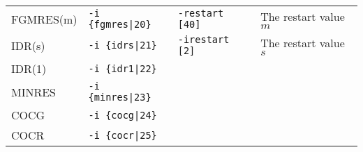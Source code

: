 \documentclass[a4paper]{article}
\begin{document}
\begin{minipage}[t]{\textwidth}
\begin{center}
\begin{tabular}{l|lll}
 FGMRES(m)   & \verb=-i {fgmres|20}=    & \verb=-restart [40]= & The restart value $m$   \\ 
 IDR(s)      & \verb=-i {idrs|21}=      & \verb=-irestart [2]= & The restart
 value $s$  \\
 IDR(1)      & \verb=-i {idr1|22}=      &    \\
 MINRES      & \verb=-i {minres|23}=    &    \\
 COCG        & \verb=-i {cocg|24}=      &    \\
 COCR        & \verb=-i {cocr|25}=      &    \\  
\hline         
\end{tabular}
\end{center}
\end{minipage}
\\ \\
\end{document}
